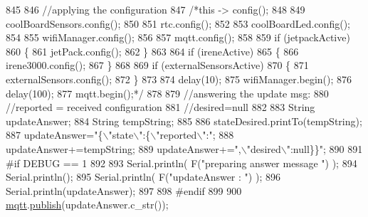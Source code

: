 \begin{DoxyCode}
845 
846             \textcolor{comment}{//applying the configuration    }
847             \textcolor{comment}{/*this -> config();}
848 \textcolor{comment}{}
849 \textcolor{comment}{            coolBoardSensors.config();}
850 \textcolor{comment}{}
851 \textcolor{comment}{            rtc.config();}
852 \textcolor{comment}{}
853 \textcolor{comment}{            coolBoardLed.config();}
854 \textcolor{comment}{            }
855 \textcolor{comment}{            wifiManager.config();}
856 \textcolor{comment}{}
857 \textcolor{comment}{            mqtt.config();}
858 \textcolor{comment}{}
859 \textcolor{comment}{            if (jetpackActive)}
860 \textcolor{comment}{            \{}
861 \textcolor{comment}{                jetPack.config();}
862 \textcolor{comment}{            \}}
863 \textcolor{comment}{}
864 \textcolor{comment}{            if (ireneActive)}
865 \textcolor{comment}{            \{}
866 \textcolor{comment}{                irene3000.config();}
867 \textcolor{comment}{            \}}
868 \textcolor{comment}{}
869 \textcolor{comment}{            if (externalSensorsActive)}
870 \textcolor{comment}{            \{}
871 \textcolor{comment}{                externalSensors.config();}
872 \textcolor{comment}{            \}}
873 \textcolor{comment}{}
874 \textcolor{comment}{            delay(10);}
875 \textcolor{comment}{            wifiManager.begin();}
876 \textcolor{comment}{            delay(100);}
877 \textcolor{comment}{            mqtt.begin();*/}
878 
879                 \textcolor{comment}{//answering the update msg:}
880             \textcolor{comment}{//reported = received configuration}
881             \textcolor{comment}{//desired=null}
882         
883             String updateAnswer;
884             String tempString;
885             
886             stateDesired.printTo(tempString);
887             updateAnswer=\textcolor{stringliteral}{"\{\(\backslash\)"state\(\backslash\)":\{\(\backslash\)"reported\(\backslash\)":"};
888             updateAnswer+=tempString;
889             updateAnswer+=\textcolor{stringliteral}{",\(\backslash\)"desired\(\backslash\)":null\}\}"};
890 
891 \textcolor{preprocessor}{        #if DEBUG == 1}
892 
893             Serial.println( F(\textcolor{stringliteral}{"preparing answer message "}) );
894             Serial.println();
895             Serial.println( F(\textcolor{stringliteral}{"updateAnswer : "}) );
896             Serial.println(updateAnswer);
897         
898 \textcolor{preprocessor}{        #endif  }
899 
900             \hyperlink{classCoolBoard_a2399f44d7c23c1149a335cb3b46d90f1}{mqtt}.\hyperlink{classCoolMQTT_ace977b3e90ab14b1199fe5c4fb0a13ec}{publish}(updateAnswer.c\_str());

\end{DoxyCode}
